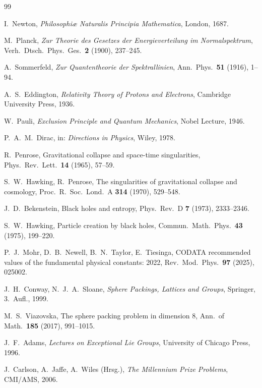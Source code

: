 \documentclass[11pt,a4paper]{article}
\theoremstyle{definition}
\theoremstyle{remark}
\numberwithin{equation}{section}
\begin{document}
\begin{thebibliography}{99}

I.~Newton,
\emph{Philosophi{\ae} Naturalis Principia Mathematica},
London, 1687.

M.~Planck,
\emph{Zur Theorie des Gesetzes der Energieverteilung im Normalspektrum},
Verh.\ Dtsch.\ Phys.\ Ges.\ \textbf{2} (1900), 237--245.

A.~Sommerfeld,
\emph{Zur Quantentheorie der Spektrallinien},
Ann.\ Phys.\ \textbf{51} (1916), 1--94.

A.~S.~Eddington,
\emph{Relativity Theory of Protons and Electrons},
Cambridge University Press, 1936.

W.~Pauli,
\emph{Exclusion Principle and Quantum Mechanics},
Nobel Lecture, 1946.

P.~A.~M.~Dirac,
in: \emph{Directions in Physics}, Wiley, 1978.

R.~Penrose,
Gravitational collapse and space-time singularities,
Phys.\ Rev.\ Lett.\ \textbf{14} (1965), 57--59.

S.~W.~Hawking, R.~Penrose,
The singularities of gravitational collapse and cosmology,
Proc.\ R.\ Soc.\ Lond.\ A \textbf{314} (1970), 529--548.

J.~D.~Bekenstein,
Black holes and entropy,
Phys.\ Rev.\ D \textbf{7} (1973), 2333--2346.

S.~W.~Hawking,
Particle creation by black holes,
Commun.\ Math.\ Phys.\ \textbf{43} (1975), 199--220.

P.~J.~Mohr, D.~B.~Newell, B.~N.~Taylor, E.~Tiesinga,
CODATA recommended values of the fundamental physical constants: 2022,
Rev.\ Mod.\ Phys.\ \textbf{97} (2025), 025002.

J.~H.~Conway, N.~J.~A.~Sloane,
\emph{Sphere Packings, Lattices and Groups},
Springer, 3.\ Aufl., 1999.

M.~S.~Viazovska,
The sphere packing problem in dimension 8,
Ann.\ of Math.\ \textbf{185} (2017), 991--1015.

J.~F.~Adams,
\emph{Lectures on Exceptional Lie Groups},
University of Chicago Press, 1996.

J.~Carlson, A.~Jaffe, A.~Wiles (Hrsg.),
\emph{The Millennium Prize Problems},
CMI/AMS, 2006.


\end{thebibliography}
\end{document}

